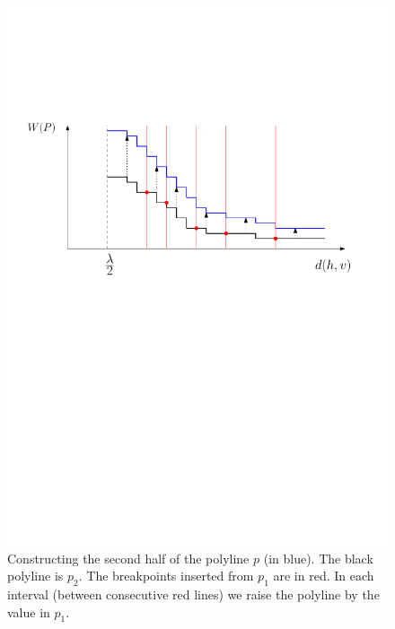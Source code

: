 \documentclass[a4paper,UKenglish]{lipics-v2016}
\theoremstyle{plain}
\begin{document}
\begin{figure}[ht]
\begin{center}
\includegraphics[scale=.55]{new_polyline_second_half}
\end{center}
\caption{Constructing the second half of the polyline $p$ (in blue). The black polyline is $p_2$. The breakpoints inserted from $p_1$ are in red. In each interval (between consecutive red lines) we raise the polyline by the value in $p_1$.
\label{figure of constructing the second half of the polyline}}
\end{figure}
\end{document}
